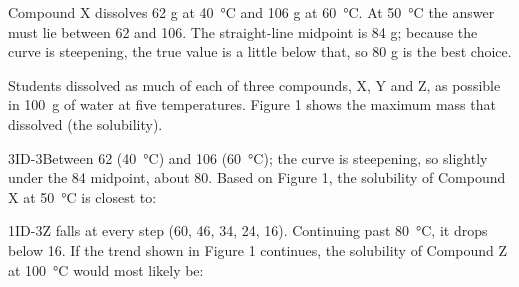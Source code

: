 \documentclass[11pt]{article}
\begin{document}
\begin{workedex}
Compound X dissolves 62 g at \SI{40}{\celsius} and 106 g at \SI{60}{\celsius}. At \SI{50}{\celsius} the answer must lie between 62 and 106. The straight-line midpoint is 84 g; because the curve is steepening, the true value is a little below that, so 80 g is the best choice.
\end{workedex}


Students dissolved as much of each of three compounds, X, Y and Z, as possible in \SI{100}{\gram} of water at five temperatures. Figure 1 shows the maximum mass that dissolved (the solubility).

\begin{figbox}
\end{figbox}
\passageend

\begin{q}{3}{ID-3}{Between 62 (\SI{40}{\celsius}) and 106 (\SI{60}{\celsius}); the curve is steepening, so slightly under the 84 midpoint, about 80.}
Based on Figure 1, the solubility of Compound X at \SI{50}{\celsius} is closest to:
\end{q}

\begin{q}{1}{ID-3}{Z falls at every step (60, 46, 34, 24, 16). Continuing past \SI{80}{\celsius}, it drops below 16.}
If the trend shown in Figure 1 continues, the solubility of Compound Z at \SI{100}{\celsius} would most likely be:
\end{q}
\end{document}

